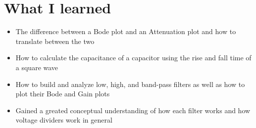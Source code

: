 \documentclass{article}
\begin{document}
\section{What I learned}
\begin{itemize}[label=--]
    \item The difference between a Bode plot and an Attenuation plot and how to translate between the two
    \item How to calculate the capacitance of a capacitor using the rise and fall time of a square wave
    \item How to build and analyze low, high, and band-pass filters as well as how to plot their Bode and Gain plots
    \item Gained a greated conceptual understanding of how each filter works and how voltage dividers work in general
\end{itemize}
\end{document}
